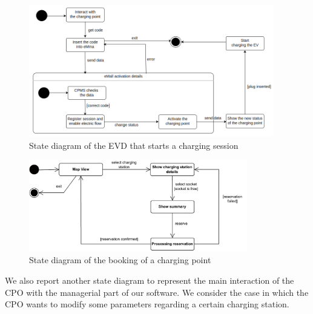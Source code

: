 
\begin{figure}[H]
    \centering
    \includegraphics[width=0.95\textwidth]{Images/ChargingNow.png}
    \caption{State diagram of the EVD that starts a charging session}
\end{figure}

\begin{figure}[H]
    \centering
    \includegraphics[width=0.85\textwidth]{Images/booking_charge_state_diag}
    \caption{State diagram of the booking of a charging point}
\end{figure}

We also report another state diagram to represent the main interaction of the CPO with the managerial part of our software. We consider the case in which the CPO wants to modify some parameters regarding a certain charging station. 

